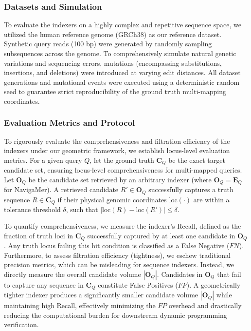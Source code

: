 \documentclass[unnumsec,webpdf,contemporary,large]{oup-authoring-template}%
\theoremstyle{thmstyleone}%
\theoremstyle{thmstyletwo}%
\theoremstyle{thmstylethree}%
\begin{document}
\subsubsection{Datasets and Simulation}
To evaluate the indexers on a highly complex and repetitive sequence space, we utilized the human reference genome (GRCh38) as our reference dataset. Synthetic query reads (100 bp) were generated by randomly sampling subsequences across the genome. To comprehensively simulate natural genetic variations and sequencing errors, mutations (encompassing substitutions, insertions, and deletions) were introduced at varying edit distances. All dataset generations and mutational events were executed using a deterministic random seed to guarantee strict reproducibility of the ground truth multi-mapping coordinates.

\subsubsection{Evaluation Metrics and Protocol}
To rigorously evaluate the comprehensiveness and filtration efficiency of the indexers under our geometric framework, we establish locus-level evaluation metrics. For a given query $Q$, let the ground truth $\textbf{C}_Q$ be the exact target candidate set, ensuring locus-level comprehensiveness for multi-mapped queries. Let $\textbf{O}_Q$ be the candidate set retrieved by an arbitrary indexer (where $\textbf{O}_Q = \textbf{E}_Q$ for NavigaMer). A retrieved candidate $R' \in \textbf{O}_Q$ successfully captures a truth sequence $R \in \textbf{C}_Q$ if their physical genomic coordinates $\mathrm{loc}(\cdot)$ are within a tolerance threshold $\delta$, such that $|\mathrm{loc}(R) - \mathrm{loc}(R')| \leq \delta$.

To quantify comprehensiveness, we measure the indexer's Recall, defined as the fraction of truth loci in $\textbf{C}_Q$ successfully captured by at least one candidate in $\textbf{O}_Q$. Any truth locus failing this hit condition is classified as a False Negative ($FN$). Furthermore, to assess filtration efficiency (tightness), we eschew traditional precision metrics, which can be misleading for sequence indexers. Instead, we directly measure the overall candidate volume $|\textbf{O}_Q|$. Candidates in $\textbf{O}_Q$ that fail to capture any sequence in $\textbf{C}_Q$ constitute False Positives ($FP$). A geometrically tighter indexer produces a significantly smaller candidate volume $|\textbf{O}_Q|$ while maintaining high Recall, effectively minimizing the $FP$ overhead and drastically reducing the computational burden for downstream dynamic programming verification.
\end{document}
